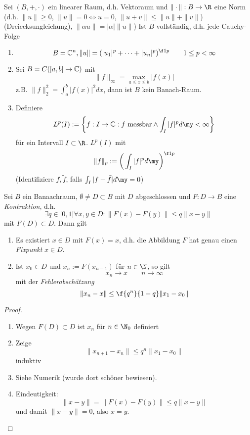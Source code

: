 \documentclass[a4paper,10pt]{scrbook}
\begin{document}
\begin{def} \label{1.1}
	Sei $(B,+,\cdot)$ ein linearer Raum, d.h. Vektoraum und $\|\cdot\|: B \to \R$ eine Norm (d.h. $\|u\| \ge 0$, $\|u\|=0 \iff u = 0$, $\|u+v\| \le \|u\| + \|v\|$) (Dreiecksungleichung), $\|\alpha u \| = |\alpha| \|u\|$)
	Ist $B$ vollständig, d.h. jede Cauchy-Folge 
\end{def}

\begin{ex} \label{1.2}
	\begin{enumerate}[1)]
		\item
			\[
				B = \C^n, \|u\| = (|u_1|^p + \dotsb + |u_n|^p)^{\f 1p} \qquad 1 \le p < \infty
			\]
		\item
			Sei $B = C([a,b] \to \mathbb{C})$ mit
			\[
				\|f\|_\infty = \max_{a \le x \le b} |f(x)|
			\]
			z.B. $\|f\|_2^2 = \int_a^b |f(x)|^2 dx$, dann ist $B$ kein Banach-Raum.
		\item
			Definiere
			\[
				L^p(I) := \bigg\{ f : I \to \C : f \text{ messbar} \land \int_I |f|^p d\my < \infty \bigg\}
			\]
			für ein Intervall $I \subset \R$.
			$L^p(I)$ mit
			\[
				\|f\|_p := \bigg( \int_I |f|^p d\my \bigg)^{\f 1p}
			\]
			(Identifiziere $f,\tilde f$, falls $\int_I |f-\tilde f| d\my = 0$)
	\end{enumerate}
\end{ex}


\begin{st} \label{1.3}
	Sei $B$ ein Banaachraum, $\emptyset \neq D \subset B$ mit $D$ abgeschlossen und $F: D \to B$ eine \emph{Kontraktion}, d.h.
	\[
		\exists q \in [0,1[ \forall x,y \in D : \|F(x) - F(y)\| \le q\|x-y\|
	\]
	mit $F(D) \subset D$. Dann gilt
	\begin{enumerate}[1)]
		\item
			Es existiert $x\in D$ mit $F(x)=x$, d.h. die Abbildung $F$ hat genau einen \emph{Fixpunkt} $x\in D$.
		\item
			Ist $x_0 \in D$ und $x_n := F(x_{n-1})$ für $n\in \N$, so gilt
			\[
				x_n \to x \qquad n \to \infty
			\]
			mit der \emph{Fehlerabschätzung}
			\[
				\|x_n - x\| \le \f{q^n}{1-q} \|x_1 - x_0\|
			\]
	\end{enumerate}
	\begin{proof}
		\begin{enumerate}[1)]
			\item
				Wegen $F(D) \subset D$ ist $x_n$ für $n\in \N_0$ definiert
			\item
				Zeige 
				\[
					\|x_{n+1} - x_n\| \le q^n \|x_1 - x_0\|
				\]
				induktiv
			\item
				Siehe Numerik (wurde dort schöner bewiesen).
			\item
				Eindeutigkeit:
				\[
					\|x-y\| = \|F(x) - F(y)\| \le q \|x-y\|
				\]
				und damit $\|x-y\| = 0$, also $x=y$.
		\end{enumerate}
	\end{proof}
\end{st}
\end{document}
